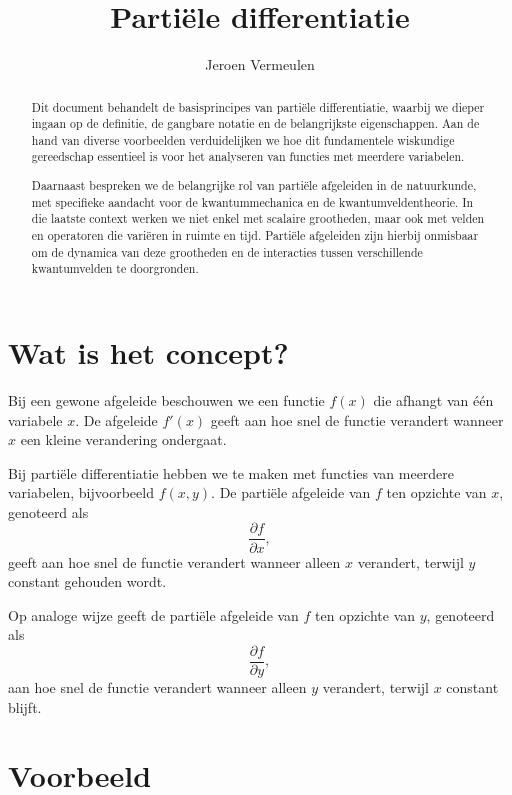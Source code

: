 \documentclass[11pt,a4paper]{article}
\title{Partiële differentiatie}
\author{Jeroen Vermeulen}
\date{}
\begin{document}
    \maketitle
    \newpage
    \tableofcontents
    \newpage

    \begin{abstract}
        Dit document behandelt de basisprincipes van partiële differentiatie, waarbij we dieper ingaan op de definitie, de gangbare notatie en de belangrijkste eigenschappen. Aan de hand van diverse voorbeelden verduidelijken we hoe dit fundamentele wiskundige gereedschap essentieel is voor het analyseren van functies met meerdere variabelen.

        Daarnaast bespreken we de belangrijke rol van partiële afgeleiden in de natuurkunde, met specifieke aandacht voor de kwantummechanica en de kwantumveldentheorie. In die laatste context werken we niet enkel met scalaire grootheden, maar ook met velden en operatoren die variëren in ruimte en tijd. Partiële afgeleiden zijn hierbij onmisbaar om de dynamica van deze grootheden en de interacties tussen verschillende kwantumvelden te doorgronden.
    \end{abstract}

    \newpage


    \section{Wat is het concept?}

    Bij een gewone afgeleide beschouwen we een functie \( f(x) \) die afhangt van één variabele \( x \). De afgeleide \( f'(x) \) geeft aan hoe snel de functie verandert wanneer \( x \) een kleine verandering ondergaat.

    Bij partiële differentiatie hebben we te maken met functies van meerdere variabelen, bijvoorbeeld \( f(x,y) \). De partiële afgeleide van \( f \) ten opzichte van \( x \), genoteerd als
    \[
        \frac{\partial f}{\partial x},
    \]
    geeft aan hoe snel de functie verandert wanneer alleen \( x \) verandert, terwijl \( y \) constant gehouden wordt.

    Op analoge wijze geeft de partiële afgeleide van \( f \) ten opzichte van \( y \), genoteerd als
    \[
        \frac{\partial f}{\partial y},
    \]
    aan hoe snel de functie verandert wanneer alleen \( y \) verandert, terwijl \( x \) constant blijft.


    \section{Voorbeeld}
\end{document}
